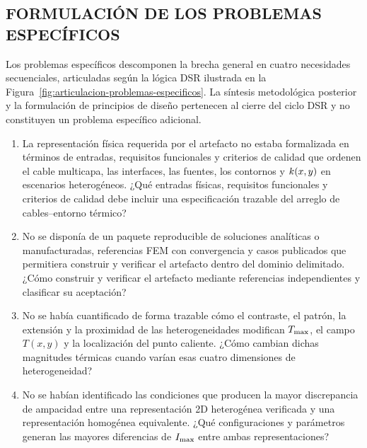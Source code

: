 \subsection{FORMULACIÓN DE LOS PROBLEMAS ESPECÍFICOS}

Los problemas específicos descomponen la brecha general en cuatro necesidades secuenciales, articuladas según la lógica DSR ilustrada en la Figura~\ref{fig:articulacion-problemas-especificos}. La síntesis metodológica posterior y la formulación de principios de diseño pertenecen al cierre del ciclo DSR y no constituyen un problema específico adicional.

\begin{enumerate}[label=PE\arabic*.]
  \item La representación física requerida por el artefacto no estaba formalizada en términos de entradas, requisitos funcionales y criterios de calidad que ordenen el cable multicapa, las interfaces, las fuentes, los contornos y $k(x,y)$ en escenarios heterogéneos. ¿Qué entradas físicas, requisitos funcionales y criterios de calidad debe incluir una especificación trazable del arreglo de cables--entorno térmico?
  \item No se disponía de un paquete reproducible de soluciones analíticas o manufacturadas, referencias FEM con convergencia y casos publicados que permitiera construir y verificar el artefacto dentro del dominio delimitado. ¿Cómo construir y verificar el artefacto mediante referencias independientes y clasificar su aceptación?
  \item No se había cuantificado de forma trazable cómo el contraste, el patrón, la extensión y la proximidad de las heterogeneidades modifican $T_{\max}$, el campo $T(x,y)$ y la localización del punto caliente. ¿Cómo cambian dichas magnitudes térmicas cuando varían esas cuatro dimensiones de heterogeneidad?
  \item No se habían identificado las condiciones que producen la mayor discrepancia de ampacidad entre una representación 2D heterogénea verificada y una representación homogénea equivalente. ¿Qué configuraciones y parámetros generan las mayores diferencias de $I_{\max}$ entre ambas representaciones?
\end{enumerate}

